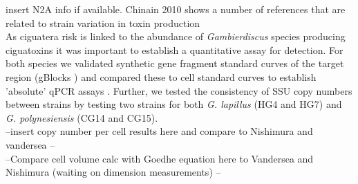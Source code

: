 \documentclass[12pt]{article}
\begin{document}
insert N2A info if available. Chinain 2010 shows a number of references that are related to strain variation in toxin production\\

As ciguatera risk is linked to the abundance of \emph{Gambierdiscus} species producing ciguatoxins it was important to establish a quantitative assay for detection.
For both species we validated synthetic gene fragment standard curves of the target region (gBlocks \textsuperscript{\textregistered}) and compared these to cell standard curves to establish 'absolute' qPCR assays \cite{nishimura2016quantitative,hariganeya2013quantitative}. Further, we tested the consistency of SSU copy numbers between strains by testing two strains for both \emph{G. lapillus} (HG4 and HG7) and \emph{G. polynesiensis} (CG14 and CG15).\\
--insert copy number per cell results here and compare to Nishimura and vandersea --\\
--Compare cell volume calc with Goedhe equation here to Vandersea and Nishimura (waiting on dimension measurements) --\\ %
\end{document}
